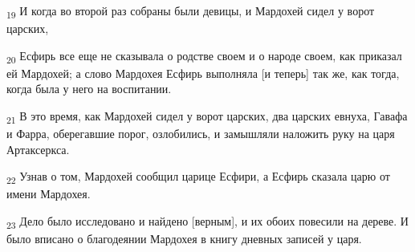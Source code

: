 \begin{tcolorbox}
\textsubscript{19} И когда во второй раз собраны были девицы, и Мардохей сидел у ворот царских,
\end{tcolorbox}
\begin{tcolorbox}
\textsubscript{20} Есфирь все еще не сказывала о родстве своем и о народе своем, как приказал ей Мардохей; а слово Мардохея Есфирь выполняла [и теперь] так же, как тогда, когда была у него на воспитании.
\end{tcolorbox}
\begin{tcolorbox}
\textsubscript{21} В это время, как Мардохей сидел у ворот царских, два царских евнуха, Гавафа и Фарра, оберегавшие порог, озлобились, и замышляли наложить руку на царя Артаксеркса.
\end{tcolorbox}
\begin{tcolorbox}
\textsubscript{22} Узнав о том, Мардохей сообщил царице Есфири, а Есфирь сказала царю от имени Мардохея.
\end{tcolorbox}
\begin{tcolorbox}
\textsubscript{23} Дело было исследовано и найдено [верным], и их обоих повесили на дереве. И было вписано о благодеянии Мардохея в книгу дневных записей у царя.
\end{tcolorbox}
